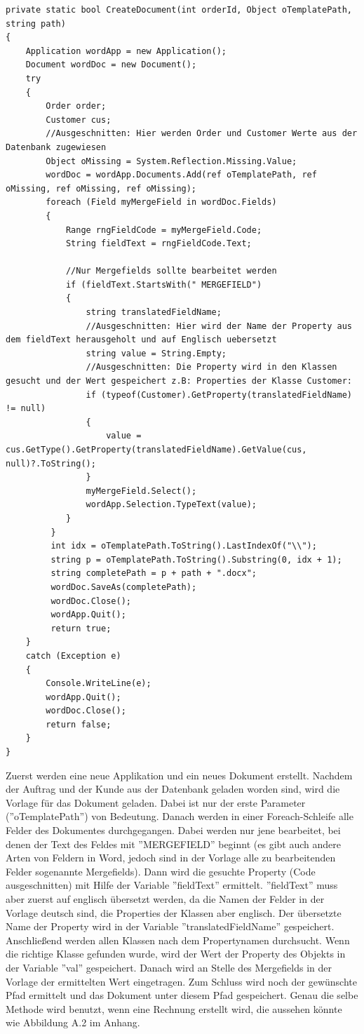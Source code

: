 \begin{lstlisting}
private static bool CreateDocument(int orderId, Object oTemplatePath, string path)
{
	Application wordApp = new Application();
	Document wordDoc = new Document();
	try
	{
		Order order;
		Customer cus;
		//Ausgeschnitten: Hier werden Order und Customer Werte aus der Datenbank zugewiesen 
		Object oMissing = System.Reflection.Missing.Value;
		wordDoc = wordApp.Documents.Add(ref oTemplatePath, ref oMissing, ref oMissing, ref oMissing);
		foreach (Field myMergeField in wordDoc.Fields)
		{
			Range rngFieldCode = myMergeField.Code;
		 	String fieldText = rngFieldCode.Text;
		 	
		 	//Nur Mergefields sollte bearbeitet werden
		 	if (fieldText.StartsWith(" MERGEFIELD")
		 	{
		 		string translatedFieldName;
		 		//Ausgeschnitten: Hier wird der Name der Property aus dem fieldText herausgeholt und auf Englisch uebersetzt
		 		string value = String.Empty;
		 		//Ausgeschnitten: Die Property wird in den Klassen gesucht und der Wert gespeichert z.B: Properties der Klasse Customer:
		 		if (typeof(Customer).GetProperty(translatedFieldName) != null)
		 		{
		 			value = cus.GetType().GetProperty(translatedFieldName).GetValue(cus, null)?.ToString();
		 		}
		 		myMergeField.Select();
		 		wordApp.Selection.TypeText(value);
		 	}
		 }
		 int idx = oTemplatePath.ToString().LastIndexOf("\\");
		 string p = oTemplatePath.ToString().Substring(0, idx + 1);
		 string completePath = p + path + ".docx";
		 wordDoc.SaveAs(completePath);
		 wordDoc.Close();
		 wordApp.Quit();
		 return true;
	}
	catch (Exception e)
	{
		Console.WriteLine(e);
		wordApp.Quit();
		wordDoc.Close();
		return false;
	}
}
\end{lstlisting}
Zuerst werden eine neue Applikation und ein neues Dokument erstellt. Nachdem der Auftrag und der Kunde aus der Datenbank geladen worden sind, wird die Vorlage für das Dokument geladen. Dabei ist nur der erste Parameter (''oTemplatePath'') von Bedeutung. Danach werden in einer Foreach-Schleife alle Felder des Dokumentes durchgegangen. Dabei werden nur jene bearbeitet, bei denen der Text des Feldes mit ''MERGEFIELD'' beginnt (es gibt auch andere Arten von Feldern in Word, jedoch sind in der Vorlage alle zu bearbeitenden Felder sogenannte Mergefields). Dann wird die gesuchte Property (Code ausgeschnitten) mit Hilfe der Variable ''fieldText'' ermittelt. ''fieldText'' muss aber zuerst auf englisch übersetzt werden, da die Namen der Felder in der Vorlage deutsch sind, die Properties der Klassen aber englisch. Der übersetzte Name der Property wird in der Variable ''translatedFieldName'' gespeichert. Anschließend werden allen Klassen nach dem Propertynamen durchsucht. Wenn die richtige Klasse gefunden wurde, wird der Wert der Property des Objekts in der Variable ''val'' gespeichert. Danach wird an Stelle des Mergefields in der Vorlage der ermittelten Wert eingetragen. Zum Schluss wird noch der gewünschte Pfad ermittelt und das Dokument unter diesem Pfad gespeichert.
Genau die selbe Methode wird benutzt, wenn eine Rechnung erstellt wird, die aussehen könnte wie Abbildung A.2 im Anhang.
